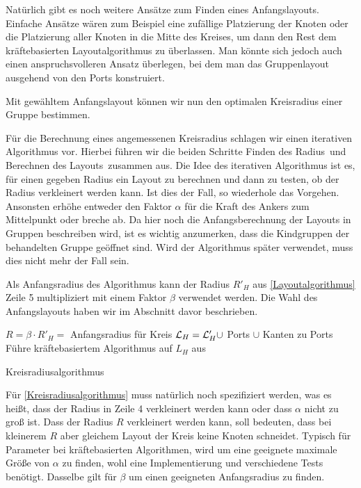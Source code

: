 Natürlich gibt es  noch weitere Ansätze zum Finden eines Anfangslayouts.
Einfache Ansätze wären zum Beispiel eine zufällige Platzierung der Knoten oder die Platzierung aller Knoten in die Mitte des Kreises, 
um dann den Rest dem kräftebasierten Layoutalgorithmus zu überlassen. 
Man könnte sich jedoch auch einen anspruchsvolleren Ansatz überlegen, bei dem man das Gruppenlayout ausgehend von den Ports konstruiert.

Mit gewähltem Anfangslayout können wir nun den optimalen Kreisradius einer Gruppe bestimmen.



Für die Berechnung eines angemessenen Kreisradius schlagen wir einen iterativen Algorithmus vor. \label{Radius}
Hierbei führen wir die beiden Schritte \glqq Finden des Radius\grqq\ und \glqq Berechnen des Layouts\grqq\ zusammen aus.
Die Idee des iterativen Algorithmus ist es, für einen gegeben Radius ein Layout zu berechnen und dann zu testen, ob der Radius verkleinert werden kann.
Ist dies der Fall, so wiederhole das Vorgehen. Ansonsten erhöhe entweder den Faktor $\alpha$ für die Kraft des Ankers zum Mittelpunkt oder breche ab. 
Da hier noch die Anfangsberechnung der Layouts in Gruppen beschreiben wird, ist es wichtig anzumerken, dass die Kindgruppen der behandelten Gruppe 
geöffnet sind.
Wird der Algorithmus später verwendet, muss dies nicht mehr der Fall sein.

Als Anfangsradius des Algorithmus kann der Radius $R'_H$ aus \autoref{Layoutalgorithmus} Zeile 5 multipliziert mit einem Faktor $\beta$ verwendet werden.
Die Wahl des Anfangslayouts haben wir im Abschnitt davor beschrieben.

\vspace{1cm}

\begin{algorithm}[H]
\SetAlgoLined
{}
$R = \beta \cdot R'_H = $ Anfangsradius für Kreis\;
$\mathcal{L}_H = \mathcal{L}'_H \cup$ Ports $\cup$  Kanten zu Ports\;
Führe kräftebasiertem Algorithmus auf  $L_H$ aus\;
\caption{Kreisradiusalgorithmus}
\label{Kreisradiusalgorithmus}
\end{algorithm}

Für \autoref{Kreisradiusalgorithmus} muss natürlich noch spezifiziert werden, was es heißt, dass der Radius in Zeile 4 verkleinert werden kann
oder dass $\alpha$ nicht zu groß ist. 
Dass der Radius $R$ verkleinert werden kann, soll bedeuten, dass bei kleinerem $R$ aber gleichem Layout der Kreis keine Knoten schneidet. 
Typisch für Parameter bei kräftebasierten Algorithmen, wird um eine geeignete maximale Größe von $\alpha$ zu finden, wohl eine Implementierung und verschiedene Tests benötigt. 
Dasselbe gilt für $\beta$ um einen geeigneten Anfangsradius zu finden.

